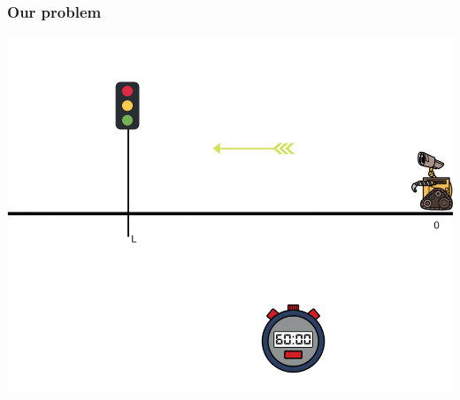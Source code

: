 \documentclass[dvipsnames,svgnames]{beamer}
\begin{document}
%

\begin{frame}
\frametitle{Our problem}
\begin{center}
\includegraphics[scale=0.4]{img/illustration_traffic_light.png}
\end{center}
\end{frame}
\end{document}
